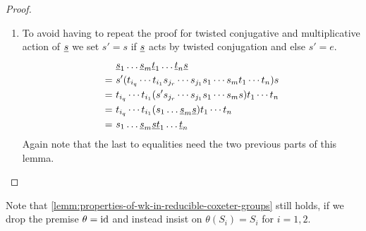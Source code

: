 \begin{lemm}
\begin{proof}
\begin{enumerate}
			\item To avoid having to repeat the proof for twisted conjugative and multiplicative action of $\underline{s}$ we set $s' = s$ if $\underline{s}$ acts by twisted conjugation and else $s' = e$.
			\begin{align*}
					& \ul s_1 \ldots \ul s_m \ul t_1 \ldots \ul t_n \ul s \\
				= \	& s' (t_{i_q} \cdots t_{i_1} s_{j_r} \cdots s_{j_1} s_1 \cdots s_m t_1 \cdots t_n) s \\
				= \	& t_{i_q} \cdots t_{i_1} (s' s_{j_r} \cdots s_{j_1} s_1 \cdots s_m s) t_1 \cdots t_n \\
				= \	& t_{i_q} \cdots t_{i_1} (s_1 \ldots \ul s_m \ul s) t_1 \cdots t_n \\
				= \	& s_1 \ldots \ul s_m \ul s \ul t_1 \ldots \ul t_n
			\end{align*}
			Again note that the last to equalities need the two previous parts of this lemma. \qedhere
		\end{enumerate}
	\end{proof}
\end{lemm}

\begin{rema}
	Note that \ref{lemm:properties-of-wk-in-reducible-coxeter-groups} still holds, if we drop the premise $\theta = \operatorname{id}$ and instead insist on $\theta(S_i) = S_i$ for $i=1,2$.
\end{rema}

